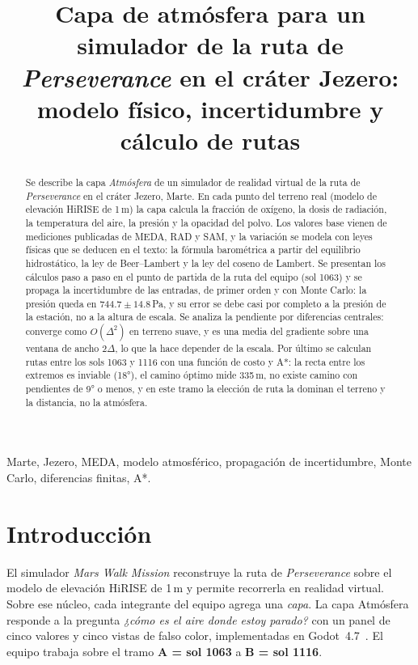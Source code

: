 \documentclass[conference]{IEEEtran}
\begin{document}
\title{Capa de atmósfera para un simulador de la ruta de \emph{Perseverance} en el cráter Jezero: modelo físico, incertidumbre y cálculo de rutas}

\author{
}

\maketitle

\begin{abstract}
Se describe la capa \emph{Atmósfera} de un simulador de realidad virtual de la ruta de \emph{Perseverance} en el cráter Jezero, Marte. En cada punto del terreno real (modelo de elevación HiRISE de 1\,m) la capa calcula la fracción de oxígeno, la dosis de radiación, la temperatura del aire, la presión y la opacidad del polvo. Los valores base vienen de mediciones publicadas de MEDA, RAD y SAM, y la variación se modela con leyes físicas que se deducen en el texto: la fórmula barométrica a partir del equilibrio hidrostático, la ley de Beer--Lambert y la ley del coseno de Lambert. Se presentan los cálculos paso a paso en el punto de partida de la ruta del equipo (sol 1063) y se propaga la incertidumbre de las entradas, de primer orden y con Monte Carlo: la presión queda en $744.7\pm14.8$\,Pa, y su error se debe casi por completo a la presión de la estación, no a la altura de escala. Se analiza la pendiente por diferencias centrales: converge como $O(\Delta^2)$ en terreno suave, y es una media del gradiente sobre una ventana de ancho $2\Delta$, lo que la hace depender de la escala. Por último se calculan rutas entre los sols 1063 y 1116 con una función de costo y A*: la recta entre los extremos es inviable (18°), el camino óptimo mide 335\,m, no existe camino con pendientes de 9° o menos, y en este tramo la elección de ruta la dominan el terreno y la distancia, no la atmósfera.
\end{abstract}

\begin{IEEEkeywords}
Marte, Jezero, MEDA, modelo atmosférico, propagación de incertidumbre, Monte Carlo, diferencias finitas, A*.
\end{IEEEkeywords}

\section{Introducción}
El simulador \emph{Mars Walk Mission} reconstruye la ruta de \emph{Perseverance} sobre el modelo de elevación HiRISE de 1\,m y permite recorrerla en realidad virtual. Sobre ese núcleo, cada integrante del equipo agrega una \emph{capa}. La capa Atmósfera responde a la pregunta \emph{¿cómo es el aire donde estoy parado?} con un panel de cinco valores y cinco vistas de falso color, implementadas en Godot~4.7~\cite{godot}. El equipo trabaja sobre el tramo \textbf{A = sol 1063} a \textbf{B = sol 1116}.
\end{document}
